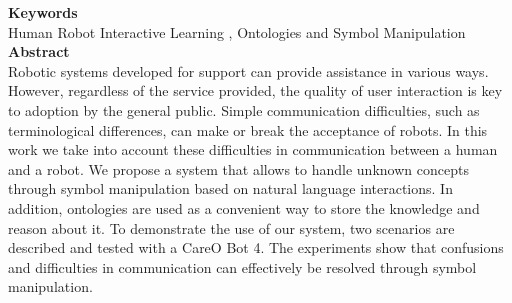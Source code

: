 \documentclass[report.tex]{subfiles}
\begin{document}
\noindent\textbf{Keywords} \\
Human Robot Interactive Learning , Ontologies and Symbol Manipulation
   \\

\noindent\textbf{Abstract} \\
Robotic systems developed for support can provide assistance in various ways. However, regardless
of the service provided, the quality of user interaction is key to adoption by the general public.
Simple communication difficulties, such as terminological differences, can make or break the
acceptance of robots. In this work we take into account these difficulties in communication between
a human and a robot. We propose a system that allows to handle unknown concepts through symbol
manipulation based on natural language interactions. In addition, ontologies are used as a
convenient way to store the knowledge and reason about it. To demonstrate the use of our system,
two scenarios are described and tested with a CareO Bot 4. The experiments show that confusions
and difficulties in communication can effectively be resolved through symbol manipulation.\\
\end{document}
